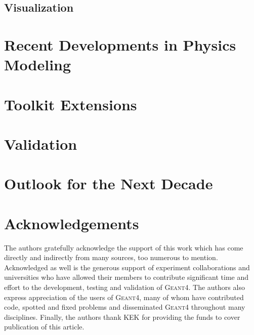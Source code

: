 \documentclass[final,5p,times,longtitle,twocolumn]{elsarticle}
\newcommand{\Gfour}{{\scshape Geant4}}
\begin{document}
  

  

  \subsection{\textbf{Visualization}}
  

\section{Recent Developments in Physics Modeling}
  

  

  

  

\section{Toolkit Extensions}

  

  

   

  

\section{Validation}
  

  

\section{Outlook for the Next Decade}
  

\section*{Acknowledgements}
The authors gratefully acknowledge the support of this work which has come 
directly and indirectly from many sources, too numerous to mention.  
Acknowledged as well is the generous support of experiment collaborations and
universities who have allowed their members to contribute significant time and
effort to the development, testing and validation of \Gfour{}.  The authors also
express appreciation of the users of \Gfour{}, many of whom have contributed 
code, spotted and fixed problems and disseminated \Gfour{} throughout many 
disciplines.  Finally, the authors thank KEK for providing the funds to cover 
publication of this article.
\end{document}
